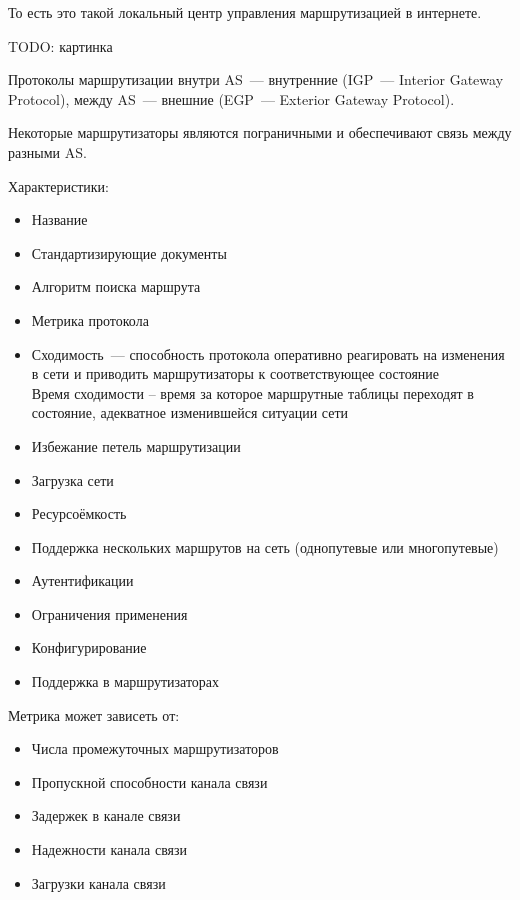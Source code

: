 То есть это такой локальный центр управления маршрутизацией в интернете.

TODO: картинка

Протоколы маршрутизации внутри AS~--- внутренние (IGP~--- Interior Gateway Protocol), между AS~--- внешние (EGP~--- Exterior Gateway Protocol).

Некоторые маршрутизаторы являются пограничными и обеспечивают связь между разными AS.


Характеристики:
\begin{itemize}
    \item Название 
    \item Стандартизирующие документы
    \item Алгоритм поиска маршрута
    \item Метрика протокола
    \item Сходимость~--- способность протокола оперативно реагировать на изменения в сети и приводить маршрутизаторы к соответствующее состояние\\
    Время сходимости – время за которое маршрутные таблицы переходят в состояние, адекватное изменившейся ситуации сети
    \item Избежание петель маршрутизации
    \item Загрузка сети
    \item Ресурсоёмкость
    \item Поддержка нескольких маршрутов на сеть (однопутевые или многопутевые)
    \item Аутентификации
    \item Ограничения применения
    \item Конфигурирование
    \item Поддержка в маршрутизаторах
\end{itemize}


Метрика может зависеть от:
\begin{itemize}
    \item Числа промежуточных маршрутизаторов
    \item Пропускной способности канала связи
    \item Задержек в канале связи
    \item Надежности канала связи
    \item Загрузки канала связи
\end{itemize}

